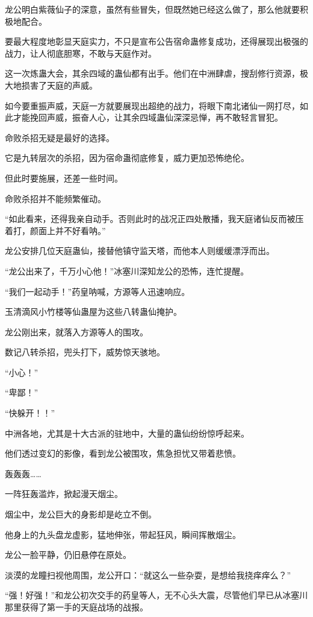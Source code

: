 \begin{this_body}
龙公明白紫薇仙子的深意，虽然有些冒失，但既然她已经这么做了，那么他就要积极地配合。

要最大程度地彰显天庭实力，不只是宣布公告宿命蛊修复成功，还得展现出极强的战力，让人彻底胆寒，不敢与天庭作对。

这一次炼蛊大会，其余四域的蛊仙都有出手。他们在中洲肆虐，搜刮修行资源，极大地损害了天庭的声威。

如今要重振声威，天庭一方就要展现出超绝的战力，将眼下南北诸仙一网打尽，如此才能挽回声威，振奋人心，让其余四域蛊仙深深忌惮，再不敢轻言冒犯。

命败杀招无疑是最好的选择。

它是九转层次的杀招，因为宿命蛊彻底修复，威力更加恐怖绝伦。

但此时要施展，还差一些时间。

命败杀招并不能频繁催动。

“如此看来，还得我亲自动手。否则此时的战况正四处散播，我天庭诸仙反而被压着打，颜面上并不好看呐。”

龙公安排几位天庭蛊仙，接替他镇守监天塔，而他本人则缓缓漂浮而出。

“龙公出来了，千万小心他！”冰塞川深知龙公的恐怖，连忙提醒。

“我们一起动手！”药皇呐喊，方源等人迅速响应。

玉清滴风小竹楼等仙蛊屋为这些八转蛊仙掩护。

龙公刚出来，就落入方源等人的围攻。

数记八转杀招，兜头打下，威势惊天骇地。

“小心！”

“卑鄙！”

“快躲开！！”

中洲各地，尤其是十大古派的驻地中，大量的蛊仙纷纷惊呼起来。

他们透过变幻的影像，看到龙公被围攻，焦急担忧又带着悲愤。

轰轰轰……

一阵狂轰滥炸，掀起漫天烟尘。

烟尘中，龙公巨大的身影却是屹立不倒。

他身上的九头盘龙虚影，猛地伸张，带起狂风，瞬间挥散烟尘。

龙公一脸平静，仍旧悬停在原处。

淡漠的龙瞳扫视他周围，龙公开口：“就这么一些杂耍，是想给我挠痒痒么？”

“强！好强！”和龙公初次交手的药皇等人，无不心头大震，尽管他们早已从冰塞川那里获得了第一手的天庭战场的战报。


\end{this_body}
